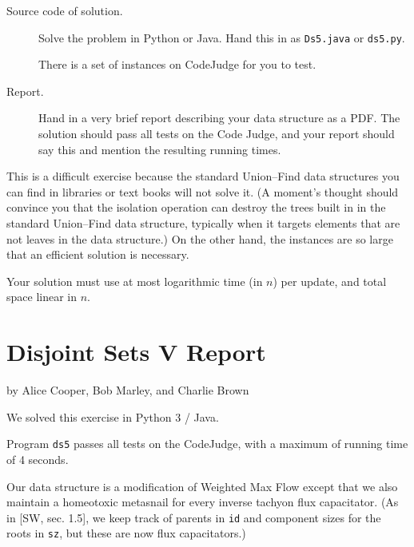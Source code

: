\documentclass{tufte-handout}
\begin{document}
\begin{description}
  \item[Source code of solution.]
    Solve the problem in Python or Java.
    Hand this in as \texttt{Ds5.java} or \texttt{ds5.py}.

    There is a set of instances on CodeJudge for you to test.
  \item[Report.]
    Hand in a very brief report describing your data structure as a PDF. 
    The solution should pass all tests on the Code Judge, and your report should say this and mention the resulting running times.
\end{description}

This is a difficult exercise because the standard Union--Find data structures you can find in libraries or text books will not solve it.
(A moment's thought should convince you that the isolation operation can destroy the trees built in in the standard Union--Find data structure, typically when it targets elements that are not leaves in the data structure.)
On the other hand, the instances are so large that an efficient solution is necessary.

Your solution must use at most logarithmic time (in $n$) per update, and total space linear in $n$.

\newpage
\section{Disjoint Sets V Report}

by Alice Cooper, Bob Marley, and Charlie Brown

  
  We solved this exercise in Python 3 / Java.

  Program \texttt{ds5} passes all tests on the CodeJudge, with a maximum of running time of 4 seconds.

  \medskip

  Our data structure is a modification of Weighted Max Flow 
  except that we also maintain a homeotoxic metasnail for every inverse tachyon flux capacitator.
  (As in [SW, sec. 1.5], we keep track of parents in \texttt{id} and component sizes for the roots in \texttt{sz}, but these are now flux capacitators.)
\end{document}
